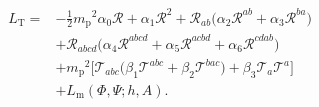 \documentclass[crop,12pt]{standalone}
\begin{document}
  \begin{equation}
    \begin{aligned}
      L_{\text{T}}= &-\tfrac{1}{2}{m_{\text{p}}}^2\alpha_0\mathcal{  R}+\alpha_1\mathcal{  R}^2+\mathcal{  R}_{ab}\big(\alpha_2\mathcal{  R}^{ab}+\alpha_3\mathcal{  R}^{ba}\big)\\
      &+\mathcal{  R}_{abcd}\big(\alpha_4\mathcal{  R}^{abcd}+\alpha_5\mathcal{  R}^{acbd}+\alpha_6\mathcal{  R}^{cdab}\big)\\
      &+{m_{\text{p}}}^2\big[\mathcal{  T}_{abc}\big(\beta_1\mathcal{  T}^{abc}+\beta_2\mathcal{  T}^{bac}\big)+\beta_3\mathcal{  T}_a\mathcal{  T}^a\big]\\
	&+L_{\text{m}}(\Phi,\Psi;h,A).
    \label{pgt_full_lagrangian}
    \end{aligned}
  \end{equation}
\end{document}
